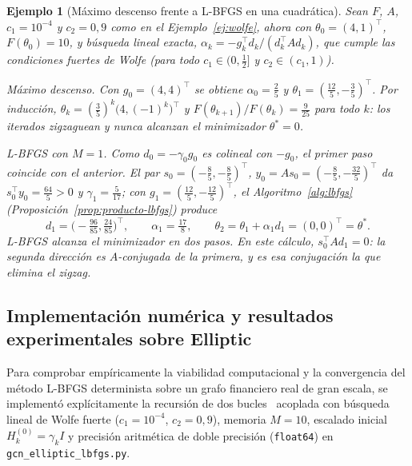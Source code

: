 \documentclass[a4paper,openany,oneside,10pt]{report}
\theoremstyle{pnlTeorema}
\theoremstyle{pnlDefinicion}
\theoremstyle{pnlObservacion}
\newtheorem{ejemplo}{Ejemplo}[section]
\begin{document}
\begin{ejemplo}[Máximo descenso frente a L-BFGS en una cuadrática]\label{ej:md-frente-lbfgs}
Sean $F$, $A$, $c_1=10^{-4}$ y $c_2=0{,}9$ como en el Ejemplo~\ref{ej:wolfe}, ahora con $\theta_0=(4,1)^\top$, $F(\theta_0)=10$, y búsqueda lineal exacta, $\alpha_k=-g_k^\top d_k/(d_k^\top A d_k)$, que cumple las condiciones fuertes de Wolfe (para todo $c_1\in(0,\frac12]$ y $c_2\in(c_1,1)$).

\emph{Máximo descenso.} Con $g_0=(4,4)^\top$ se obtiene $\alpha_0=\frac25$ y $\theta_1=(\frac{12}5,-\frac35)^\top$. Por inducción, $\theta_k=(\frac35)^k\bigl(4,(-1)^k\bigr)^\top$ y $F(\theta_{k+1})/F(\theta_k)=\frac9{25}$ para todo $k$: los iterados zigzaguean y nunca alcanzan el minimizador $\theta^*=0$.

\emph{L-BFGS con $M=1$.} Como $d_0=-\gamma_0g_0$ es colineal con $-g_0$, el primer paso coincide con el anterior. El par $s_0=(-\frac85,-\frac85)^\top$, $y_0=As_0=(-\frac85,-\frac{32}5)^\top$ da $s_0^\top y_0=\frac{64}5>0$ y $\gamma_1=\frac5{17}$; con $g_1=(\frac{12}5,-\frac{12}5)^\top$, el Algoritmo~\ref{alg:lbfgs} (Proposición~\ref{prop:producto-lbfgs}) produce
\[
d_1=\bigl(-\tfrac{96}{85},\tfrac{24}{85}\bigr)^\top,\qquad \alpha_1=\tfrac{17}{8},\qquad \theta_2=\theta_1+\alpha_1d_1=(0,0)^\top=\theta^*.
\]
L-BFGS alcanza el minimizador en dos pasos. En este cálculo, $s_0^\top A d_1=0$: la segunda dirección es $A$-conjugada de la primera, y es esa conjugación la que elimina el zigzag.
\end{ejemplo}

\subsection{Implementación numérica y resultados experimentales sobre Elliptic}
\label{subsec:lbfgs-experimentos-elliptic}

Para comprobar empíricamente la viabilidad computacional y la convergencia del
método L-BFGS determinista sobre un grafo financiero real de gran escala, se
implementó explícitamente la recursión de dos bucles~\cite[Algoritmo~1.6, p.~39]{andrei2020}
acoplada con búsqueda lineal de Wolfe fuerte ($c_1=10^{-4}$, $c_2=0{,}9$),
memoria $M=10$, escalado inicial $H_k^{(0)}=\gamma_k I$ y precisión aritmética
de doble precisión (\texttt{float64}) en \texttt{gcn\_elliptic\_lbfgs.py}.
\end{document}
